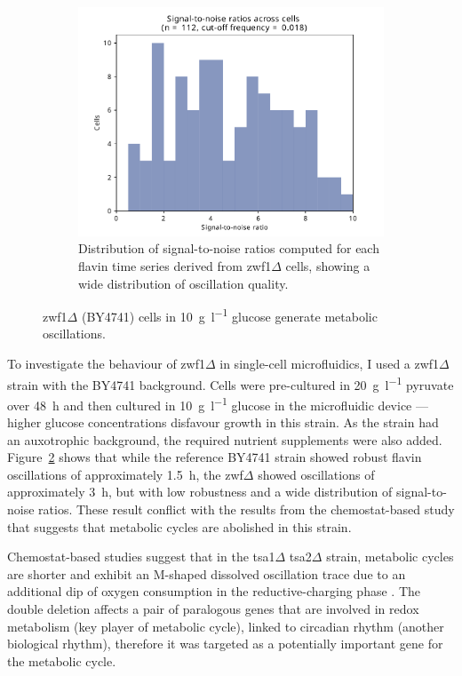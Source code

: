 \begin{figure}
  \begin{subfigure}[t]{0.45\textwidth}
   \centering
   \includegraphics[width=\textwidth]{zwf1egf_409_10.pdf}
   \caption{
    Distribution of signal-to-noise ratios computed for each flavin time series derived from zwf1$\Delta$ cells, showing a wide distribution of oscillation quality.
   }
   \label{fig:biology-zwf1-snr}
  \end{subfigure}%

  \caption{
    zwf1$\Delta$ (BY4741) cells in \SI{10}{\gram~\litre^{-1}} glucose generate metabolic oscillations.
  }
  \label{fig:biology-zwf1}
\end{figure}


To investigate the behaviour of zwf1$\Delta$ in single-cell microfluidics, I used a zwf1$\Delta$ strain with the BY4741 background.
Cells were pre-cultured in \SI{20}{\gram~\litre^{-1}} pyruvate over \SI{48}{\hour} and then cultured in \SI{10}{\gram~\litre^{-1}} glucose in the microfluidic device --- higher glucose concentrations disfavour growth in this strain.
As the strain had an auxotrophic background, the required nutrient supplements were also added.
Figure~\ref{fig:biology-zwf1} shows that while the reference BY4741 strain showed robust flavin oscillations of approximately \SI{1.5}{\hour}, the zwf$\Delta$ showed oscillations of approximately \SI{3}{\hour}, but with low robustness and a wide distribution of signal-to-noise ratios.
These result conflict with the results from the chemostat-based study that suggests that metabolic cycles are abolished in this strain.

Chemostat-based studies suggest that in the tsa1$\Delta$ tsa2$\Delta$ strain, metabolic cycles are shorter and exhibit an M-shaped dissolved oscillation trace due to an additional dip of oxygen consumption in the reductive-charging phase \parencite{caustonMetabolicCyclesYeast2015}. %
The double deletion affects a pair of paralogous genes that are involved in redox metabolism (key player of metabolic cycle), linked to circadian rhythm (another biological rhythm), therefore it was targeted as a potentially important gene for the metabolic cycle.

